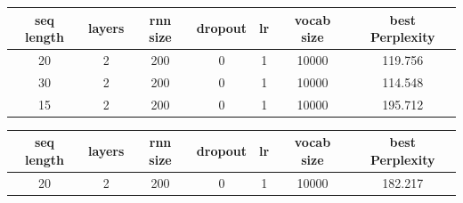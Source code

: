 \documentclass{article}
\begin{document}
\begin{center}
\begin{tabular}{ |c|c|c|c|c|c|c|} 
\hline
seq length & layers & rnn size & dropout & lr & vocab size & best Perplexity\\
\hline
 20 & 2 & 200 & 0 & 1 & 10000 & 119.756\\ 
 30 & 2 & 200 & 0 & 1 & 10000 & 114.548\\ 
 15 & 2 & 200 & 0 & 1 & 10000 & 195.712\\ 
\hline
\end{tabular}
\end{center}

\begin{center}
\begin{tabular}{ |c|c|c|c|c|c|c|} 
\hline
seq length & layers & rnn size & dropout & lr & vocab size & best Perplexity\\
\hline
 20 & 2 & 200 & 0 & 1 & 10000 & 182.217\\ 

\hline
\end{tabular}
\end{center}



\medskip

\small




\end{document}
